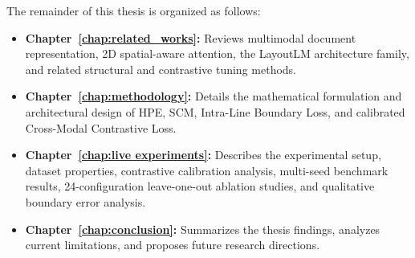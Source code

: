 The remainder of this thesis is organized as follows:
\begin{itemize}
    \item \textbf{Chapter~\ref{chap:related_works}:} Reviews multimodal document representation, 2D spatial-aware attention, the LayoutLM architecture family, and related structural and contrastive tuning methods.
    \item \textbf{Chapter~\ref{chap:methodology}:} Details the mathematical formulation and architectural design of HPE, SCM, Intra-Line Boundary Loss, and calibrated Cross-Modal Contrastive Loss.
    \item \textbf{Chapter~\ref{chap:live experiments}:} Describes the experimental setup, dataset properties, contrastive calibration analysis, multi-seed benchmark results, 24-configuration leave-one-out ablation studies, and qualitative boundary error analysis.
    \item \textbf{Chapter~\ref{chap:conclusion}:} Summarizes the thesis findings, analyzes current limitations, and proposes future research directions.
\end{itemize}
